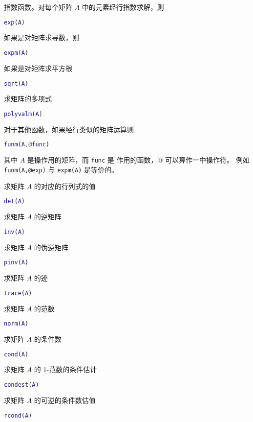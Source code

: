 \documentclass{ctexart}
\begin{document}
 指数函数。对每个矩阵 $A$ 中的元素经行指数求解，则
 \begin{lstlisting}[language=matlab]
 exp(A)
 \end{lstlisting}
 如果是对矩阵求导数，则
 \begin{lstlisting}[language=matlab]
 expm(A)
 \end{lstlisting}
 如果是对矩阵求平方根
 \begin{lstlisting}[language=matlab]
 sqrt(A)
 \end{lstlisting}
 求矩阵的多项式
 \begin{lstlisting}[language=matlab]
 polyvalm(A)
 \end{lstlisting}
 对于其他函数，如果经行类似的矩阵运算则
 \begin{lstlisting}[language=matlab]
 funm(A,@func)
 \end{lstlisting}
 其中 $A$ 是操作用的矩阵，而 \lstinline|func| 是 作用的函数，@ 可以算作一中操作符。
 例如 \lstinline|funm(A,@exp)| 与 \lstinline|expm(A)| 是等价的。

 求矩阵 $A$ 的对应的行列式的值
 \begin{lstlisting}[language=matlab]
 det(A)
 \end{lstlisting}

 求矩阵 $A$ 的逆矩阵
 \begin{lstlisting}[language=matlab]
 inv(A)
 \end{lstlisting}

 求矩阵 $A$ 的伪逆矩阵
 \begin{lstlisting}[language=matlab]
 pinv(A)
 \end{lstlisting}

 求矩阵 $A$ 的迹
 \begin{lstlisting}[language=matlab]
 trace(A)
 \end{lstlisting}

 求矩阵 $A$ 的范数
 \begin{lstlisting}[language=matlab]
 norm(A)
 \end{lstlisting}

 求矩阵 $A$ 的条件数
 \begin{lstlisting}[language=matlab]
 cond(A)
 \end{lstlisting}

 求矩阵 $A$ 的 1-范数的条件估计
 \begin{lstlisting}[language=matlab]
 condest(A)
 \end{lstlisting}

 求矩阵 $A$ 的可逆的条件数估值
 \begin{lstlisting}[language=matlab]
 rcond(A)
 \end{lstlisting}
\end{document}
